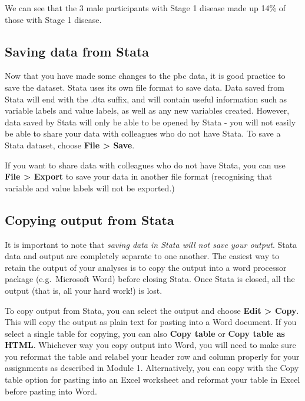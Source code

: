 \documentclass[
  a4paper,
]{memoir}
\begin{document}
We can see that the 3 male participants with Stage 1 disease made up
14\% of those with Stage 1 disease.

\hypertarget{saving-data-from-stata}{%
\subsection{Saving data from Stata}\label{saving-data-from-stata}}

Now that you have made some changes to the pbc data, it is good practice
to save the dataset. Stata uses its own file format to save data. Data
saved from Stata will end with the .dta suffix, and will contain useful
information such as variable labels and value labels, as well as any new
variables created. However, data saved by Stata will only be able to be
opened by Stata - you will not easily be able to share your data with
colleagues who do not have Stata. To save a Stata dataset, choose
\textbf{File \textgreater{} Save}.

If you want to share data with colleagues who do not have Stata, you can
use \textbf{File \textgreater{} Export} to save your data in another
file format (recognising that variable and value labels will not be
exported.)

\hypertarget{copying-output-from-stata}{%
\subsection{Copying output from Stata}\label{copying-output-from-stata}}

It is important to note that \emph{saving data in Stata will not save
your output}. Stata data and output are completely separate to one
another. The easiest way to retain the output of your analyses is to
copy the output into a word processor package (e.g.~Microsoft Word)
before closing Stata. Once Stata is closed, all the output (that is, all
your hard work!) is lost.

To copy output from Stata, you can select the output and choose
\textbf{Edit \textgreater{} Copy}. This will copy the output as plain
text for pasting into a Word document. If you select a single table for
copying, you can also \textbf{Copy table} or \textbf{Copy table as
HTML}. Whichever way you copy output into Word, you will need to make
sure you reformat the table and relabel your header row and column
properly for your assignments as described in Module 1. Alternatively,
you can copy with the Copy table option for pasting into an Excel
worksheet and reformat your table in Excel before pasting into Word.
\end{document}
